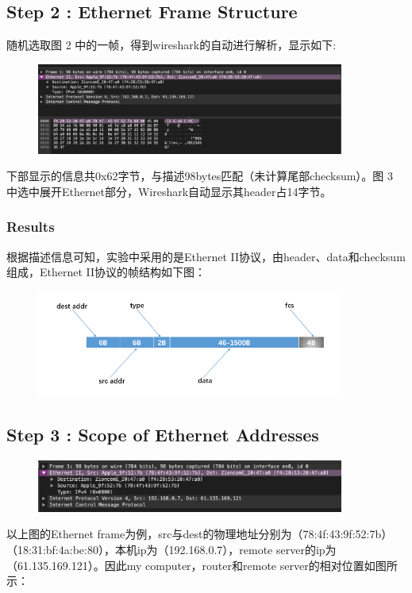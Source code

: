 \documentclass{article}
\begin{document}
   
    \subsection{Step 2 : Ethernet Frame Structure}
   随机选取图 2 中的一帧，得到wireshark的自动进行解析，显示如下:
   
  \begin{figure}[H]
        \centering
        \includegraphics[width=0.9\textwidth]{img/exp123.png}
        \caption{}
        \label{fig.3}
    \end{figure}
  下部显示的信息共0x62字节，与描述98bytes匹配（未计算尾部checksum）。图 3 中选中展开Ethernet部分，Wireshark自动显示其header占14字节。
  
  \subsubsection{Results}
  根据描述信息可知，实验中采用的是Ethernet II协议，由header、data和checksum组成，Ethernet II协议的帧结构如下图：
   \begin{figure}[H]
        \centering
        \includegraphics[width=0.9\textwidth]{img/exp123A.png}
        \caption{}
        \label{fig.4}
    \end{figure}
    
    \subsection{Step 3 : Scope of Ethernet Addresses}
    
      \begin{figure}[H]
        \centering
        \includegraphics[width=0.9\textwidth]{img/exp123B.png}
        \caption{}
        \label{fig.4}
    \end{figure}
    以上图的Ethernet frame为例，src与dest的物理地址分别为（78:4f:43:9f:52:7b）（18:31:bf:4a:be:80），本机ip为（192.168.0.7），remote server的ip为（61.135.169.121）。因此my computer，router和remote server的相对位置如图所示：
 
\end{document}
